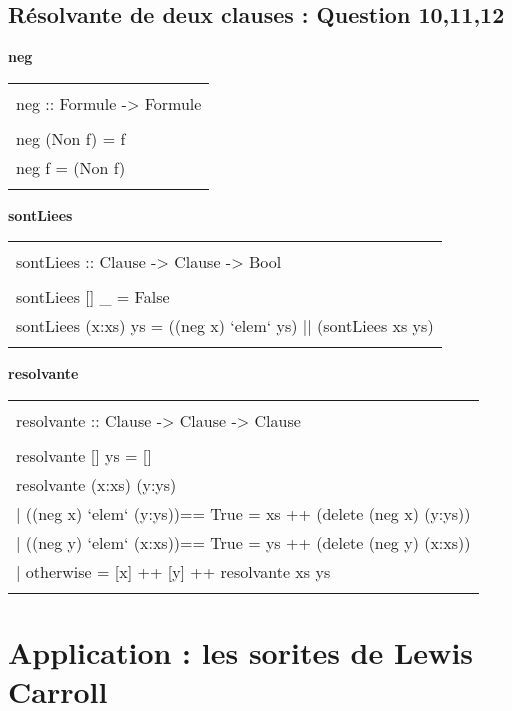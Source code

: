 \documentclass{article}
\newenvironment{code}[1]
    {\begin{center}
    \textbf{#1\\[1ex]}
    \begin{tabular}{|p{0.9\textwidth}|}
    \hline\\
    }
    { 
    \\\\\hline
    \end{tabular} 
    \end{center}
    }
\begin{document}
\subsection{Résolvante de deux clauses : Question 10,11,12}
\begin{code}{neg}
    neg :: Formule -> Formule\\
    \\
    neg (Non f) = f\\
    neg f = (Non f)
\end{code}
\begin{code}{sontLiees}
    sontLiees :: Clause -> Clause -> Bool\\
    \\
    sontLiees [] \_ = False\\
    sontLiees (x:xs) ys = ((neg x) `elem` ys) || (sontLiees xs ys)
\end{code}
\newpage
\begin{code}{resolvante}
    resolvante :: Clause -> Clause -> Clause\\
    \\
    resolvante [] ys = []\\
    resolvante (x:xs) (y:ys)\\
    \tabto{5mm}| ((neg x) `elem` (y:ys))== True =  xs ++ (delete (neg x) (y:ys))\\
    \tabto{5mm}| ((neg y) `elem` (x:xs))== True =  ys ++ (delete (neg y) (x:xs))\\
    \tabto{5mm}| otherwise = [x] ++ [y] ++ resolvante xs ys
    
        
\end{code}
\section{Application : les sorites de Lewis Carroll}
\end{document}
